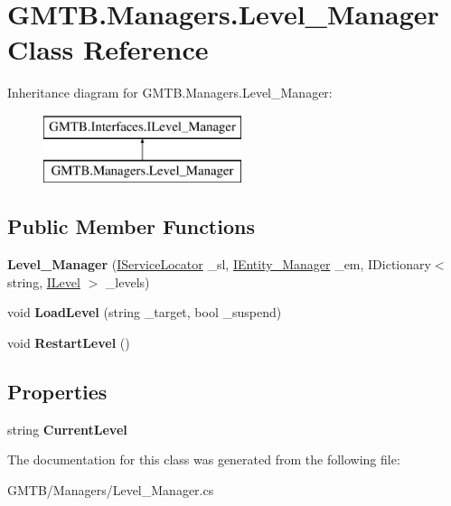 \hypertarget{class_g_m_t_b_1_1_managers_1_1_level___manager}{}\section{G\+M\+T\+B.\+Managers.\+Level\+\_\+\+Manager Class Reference}
\label{class_g_m_t_b_1_1_managers_1_1_level___manager}
Inheritance diagram for G\+M\+T\+B.\+Managers.\+Level\+\_\+\+Manager\+:\begin{figure}[H]
\begin{center}
\leavevmode
\includegraphics[height=2.000000cm]{class_g_m_t_b_1_1_managers_1_1_level___manager}
\end{center}
\end{figure}
\subsection*{Public Member Functions}
\begin{DoxyCompactItemize}
\item 
\mbox{\label{class_g_m_t_b_1_1_managers_1_1_level___manager_a281f5c2b9186e7f834ec4f4971ce5b8c}} 
{\bfseries Level\+\_\+\+Manager} (\mbox{\hyperlink{interface_g_m_t_b_1_1_interfaces_1_1_i_service_locator}{I\+Service\+Locator}} \+\_\+sl, \mbox{\hyperlink{interface_g_m_t_b_1_1_interfaces_1_1_i_entity___manager}{I\+Entity\+\_\+\+Manager}} \+\_\+em, I\+Dictionary$<$ string, \mbox{\hyperlink{interface_g_m_t_b_1_1_interfaces_1_1_i_level}{I\+Level}} $>$ \+\_\+levels)
\item 
\mbox{\label{class_g_m_t_b_1_1_managers_1_1_level___manager_afc0e4c7f0ae512d2c67f76175e4eb129}} 
void {\bfseries Load\+Level} (string \+\_\+target, bool \+\_\+suspend)
\item 
\mbox{\label{class_g_m_t_b_1_1_managers_1_1_level___manager_aece4e1c3b61846a622a38e63a474bd69}} 
void {\bfseries Restart\+Level} ()
\end{DoxyCompactItemize}
\subsection*{Properties}
\begin{DoxyCompactItemize}
\item 
\mbox{\label{class_g_m_t_b_1_1_managers_1_1_level___manager_acba428f5095c75eeb1ebda34715e35da}} 
string {\bfseries Current\+Level}
\end{DoxyCompactItemize}


The documentation for this class was generated from the following file\+:\begin{DoxyCompactItemize}
\item 
G\+M\+T\+B/\+Managers/Level\+\_\+\+Manager.\+cs\end{DoxyCompactItemize}
